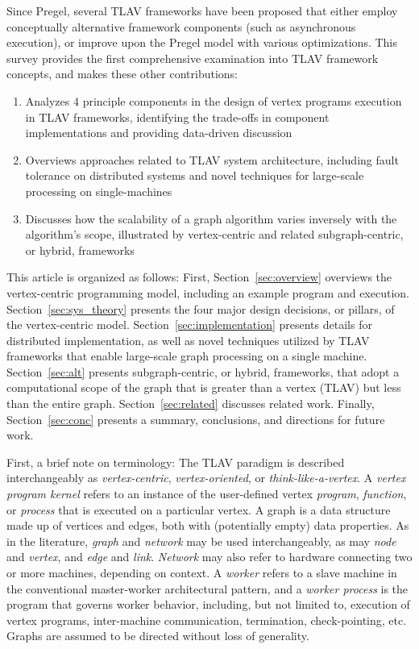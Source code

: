 \documentclass[reprint,twocolumn,showpacs,preprintnumbers,amsmath, aps,pre,amssymb]{revtex4-1}
\begin{document}
Since Pregel, several TLAV frameworks have been proposed that either employ conceptually alternative framework components (such as asynchronous execution), or improve upon the Pregel model with various optimizations.  This survey provides the first comprehensive examination into TLAV framework concepts, and makes these other contributions:

\begin{enumerate}
\item Analyzes 4 principle components in the design of vertex programs execution in TLAV frameworks, identifying the trade-offs in component implementations and providing data-driven discussion
\item Overviews approaches related to TLAV system architecture, including fault tolerance on distributed systems and novel techniques for large-scale processing on single-machines
\item Discusses how the scalability of a graph algorithm varies inversely with the algorithm's scope, illustrated by vertex-centric and related subgraph-centric, or hybrid, frameworks
\end{enumerate}

This article is organized as follows: First, Section~\ref{sec:overview} overviews the vertex-centric programming model, including an example program and execution.  Section~\ref{sec:sys_theory} presents the four major design decisions, or pillars, of the vertex-centric model. Section~\ref{sec:implementation} presents details for distributed implementation, as well as novel techniques utilized by TLAV frameworks that enable large-scale graph processing on a single machine.  Section~\ref{sec:alt} presents subgraph-centric, or hybrid, frameworks, that adopt a computational scope of the graph that is greater than a vertex (TLAV) but less than the entire graph.  Section~\ref{sec:related} discusses related work.  Finally, Section~\ref{sec:conc} presents a summary, conclusions, and directions for future work.

First, a brief note on terminology:  The TLAV paradigm is described interchangeably as \textit{vertex-centric}, \textit{vertex-oriented}, or \textit{think-like-a-vertex}.  A \textit{vertex program kernel} refers to an instance of the user-defined vertex \textit{program}, \textit{function}, or \textit{process} that is executed on a particular vertex.  A graph is a data structure made up of vertices and edges, both with (potentially empty) data properties.  As in the literature, \textit{graph} and \textit{network} may be used interchangeably, as may \textit{node} and \textit{vertex}, and \textit{edge} and \textit{link}.  \textit{Network} may also refer to hardware connecting two or more machines, depending on context.  A \textit{worker} refers to a slave machine in the conventional master-worker architectural pattern, and a \textit{worker process} is the program that governs worker behavior, including, but not limited to, execution of vertex programs, inter-machine communication, termination, check-pointing, etc.  Graphs are assumed to be directed without loss of generality.
\end{document}
